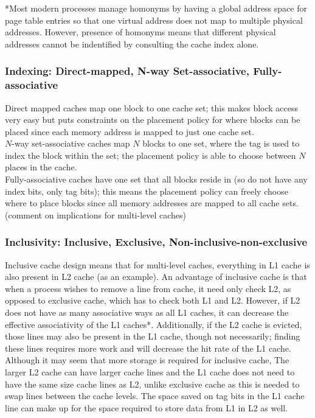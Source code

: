 \documentclass[a4paper, 12pt, oneside]{book}
\begin{document}

*Most modern processes manage homonyms by having a global address space for page table entries so that one virtual address does not map to multiple physical addresses. However, presence of homonyms means that different physical addresses cannot be indentified by consulting the cache index alone.

\subsubsection{Indexing: Direct-mapped, N-way Set-associative, Fully-associative}
Direct mapped caches map one block to one cache set; this makes block access very easy but puts constraints on the placement policy for where blocks can be placed since each memory address is mapped to just one cache set.\\

$N$-way set-associative caches map $N$ blocks to one set, where the tag is used to index the block within the set; the placement policy is able to choose between $N$ places in the cache.\\

Fully-associative caches have one set that all blocks reside in (so do not have any index bits, only tag bits); this means the placement policy can freely choose where to place blocks since all memory addresses are mapped to all cache sets.\\

(comment on implications for multi-level caches)

\subsubsection{Inclusivity: Inclusive, Exclusive, Non-inclusive-non-exclusive}

Inclusive cache design means that for multi-level caches, everything in L1 cache is also present in L2 cache (as an example). An advantage of inclusive cache is that when a process wishes to remove a line from cache, it need only check L2, as opposed to exclusive cache, which has to check both L1 and L2. However, if L2 does not have as many associative ways as all L1 caches, it can decrease the effective associativity of the L1 caches*. Additionally, if the L2 cache is evicted, those lines may also be present in the L1 cache, though not necessarily; finding these lines requires more work and will decrease the hit rate of the L1 cache. Although it may seem that more storage is required for inclusive cache, The larger L2 cache can have larger cache lines and the L1 cache does not need to have the same size cache lines as L2, unlike exclusive cache as this is needed to swap lines between the cache levels. The space saved on tag bits in the L1 cache line can make up for the space required to store data from L1 in L2 as well.\\
\end{document}
